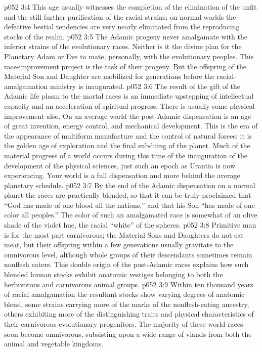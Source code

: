 \vs p052 3:4 \pc This age usually witnesses the completion of the elimination of the unfit and the still further purification of the racial strains; on normal worlds the defective bestial tendencies are very nearly eliminated from the reproducing stocks of the realm.
\vs p052 3:5 The Adamic progeny never amalgamate with the inferior strains of the evolutionary races. Neither is it the divine plan for the Planetary Adam or Eve to mate, personally, with the evolutionary peoples. This race\hyp{}improvement project is the task of their progeny. But the offspring of the Material Son and Daughter are mobilized for generations before the racial\hyp{}amalgamation ministry is inaugurated.
\vs p052 3:6 The result of the gift of the Adamic life plasm to the mortal races is an immediate upstepping of intellectual capacity and an acceleration of spiritual progress. There is usually some physical improvement also. On an average world the post\hyp{}Adamic dispensation is an age of great invention, energy control, and mechanical development. This is the era of the appearance of multiform manufacture and the control of natural forces; it is the golden age of exploration and the final subduing of the planet. Much of the material progress of a world occurs during this time of the inauguration of the development of the physical sciences, just such an epoch as Urantia is now experiencing. Your world is a full dispensation and more behind the average planetary schedule.
\vs p052 3:7 By the end of the Adamic dispensation on a normal planet the races are practically blended, so that it can be truly proclaimed that “God has made of one blood all the nations,” and that his Son “has made of one color all peoples.” The color of such an amalgamated race is somewhat of an olive shade of the violet hue, the racial “white” of the spheres.
\vs p052 3:8 \pc Primitive man is for the most part carnivorous; the Material Sons and Daughters do not eat meat, but their offspring within a few generations usually gravitate to the omnivorous level, although whole groups of their descendants sometimes remain nonflesh eaters. This double origin of the post\hyp{}Adamic races explains how such blended human stocks exhibit anatomic vestiges belonging to both the herbivorous and carnivorous animal groups.
\vs p052 3:9 Within ten thousand years of racial amalgamation the resultant stocks show varying degrees of anatomic blend, some strains carrying more of the marks of the nonflesh\hyp{}eating ancestry, others exhibiting more of the distinguishing traits and physical characteristics of their carnivorous evolutionary progenitors. The majority of these world races soon become omnivorous, subsisting upon a wide range of viands from both the animal and vegetable kingdoms.
